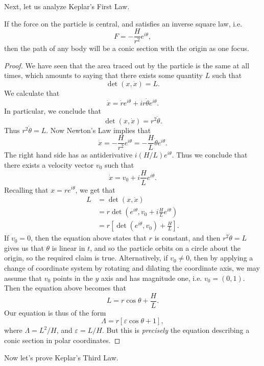 Next, let us analyze Keplar's First Law.

\begin{theorem}
    If the force on the particle is central, and satisfies an inverse square law, i.e.
    \[ F = - \frac{H}{r^2} e^{i \theta}, \]
    then the path of any body will be a conic section with the origin as one focus.
\end{theorem}
\begin{proof}
    We have seen that the area traced out by the particle is the same at all times, which amounts to saying that there exists some quantity $L$ such that
    \[ \det(x, \dot{x}) = L. \]
    We calculate that
    \[ \dot{x} = \dot{r} e^{i \theta} + i r \dot{\theta} e^{i \theta}. \]
    In particular, we conclude that
    \[ \det(x, \dot{x}) = r^2 \dot{\theta}. \]
    Thus $r^2 \dot{\theta} = L$. Now Newton's Law implies that
    \[ \ddot{x} = - \frac{H}{r^2} e^{i \theta} = - \frac{H}{L} \dot{\theta} e^{i \theta}. \]
    The right hand side has as antiderivative $i (H/L) e^{i \theta}$. Thus we conclude that there exists a velocity vector $v_0$ such that
    \[ \dot{x} = v_0 + i \frac{H}{L} e^{i \theta}. \]
    Recalling that $x = r e^{i \theta}$, we get that
    \begin{align*}
        L &= \det(x, \dot{x})\\
        &= r \det( e^{i \theta}, v_0 + i \frac{H}{L} e^{i \theta} )\\
        &= r \left[ \det( e^{i \theta}, v_0 ) + \frac{H}{L} \right].
    \end{align*}
    If $v_0 = 0$, then the equation above states that $r$ is constant, and then $r^2 \dot{\theta} = L$ gives us that $\theta$ is linear in $t$, and so the particle orbits on a circle about the origin, so the required claim is true. Alternatively, if $v_0 \neq 0$, then by applying a change of coordinate system by rotating and dilating the coordinate axis, we may assume that $v_0$ points in the $y$ axis and has magnitude one, i.e. $v_0 = (0,1)$. Then the equation above becomes that
    \[ L = r \cos \theta + \frac{H}{L}. \]
    Our equation is thus of the form
    \[ \Lambda = r [ \varepsilon \cos \theta + 1 ], \]
    where $\Lambda = L^2 / H$, and $\varepsilon = L / H$. But this is \emph{precisely} the equation describing a conic section in polar coordinates.
\end{proof}

Now let's prove Keplar's Third Law.

